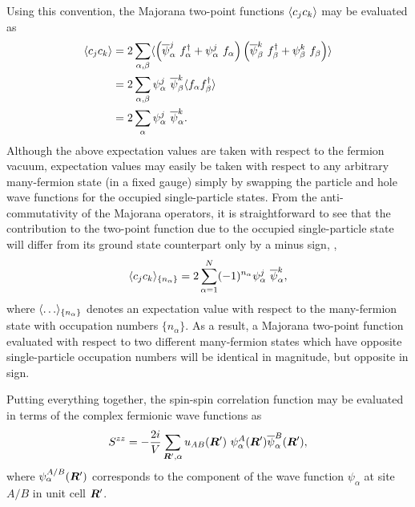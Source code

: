 Using this convention, the Majorana two-point functions $\langle c_j c_k \rangle$ may be evaluated as
%
\begin{align}
	\langle c_j c_k \rangle	&= 2 \sum_{\alpha, \beta} \langle  \left( \overline{\psi}^j_\alpha ~f^{\dagger}_\alpha + \psi^j_\alpha ~f_\alpha \right) \left( \overline{\psi}^k_\beta ~f^{\dagger}_\beta + \psi^k_\beta ~f_\beta \right)  \rangle \nonumber\\
					&= 2 \sum_{\alpha, \beta} \psi^j_\alpha ~\overline{\psi}^k_\beta \langle  f_\alpha f^{\dagger}_\beta  \rangle \nonumber\\
					&= 2 \sum_\alpha \psi^j_\alpha ~\overline{\psi}^k_\alpha.
	\label{eq:chapter07_TwoPointFermionZeroT}
\end{align}
%
Although the above expectation values are taken with respect to the fermion vacuum, expectation values may easily be taken with respect to any arbitrary many-fermion state (in a fixed gauge) simply by swapping the particle and hole wave functions for the occupied single-particle states.
From the anti-commutativity of the Majorana operators, it is straightforward to see that the contribution to the two-point function due to the occupied single-particle state will differ from its ground state counterpart only by a minus sign, \ie,
%
\begin{equation}
	\langle c_j c_k \rangle_{\{n_\alpha\}} = 2 \sum_{\alpha=1}^N (-1)^{n_\alpha} \psi^j_\alpha ~\overline{\psi}^k_\alpha,
\end{equation}
%
where $\langle \ldots \rangle_{\{n_\alpha\}}$ denotes an expectation value with respect to the many-fermion state with occupation numbers $\{n_\alpha\}$.
As a result, a Majorana two-point function evaluated with respect to two different many-fermion states which have opposite single-particle occupation numbers will be identical in magnitude, but opposite in sign.

Putting everything together, the spin-spin correlation function may be evaluated in terms of the complex fermionic wave functions as
%
\begin{equation}
	S^{z z}	= -\frac{2i}{V} \sum_{\bm{R}', \alpha} u_{AB}(\bm{R}')~\psi_{\alpha}^A(\bm{R}') \overline{\psi}_{\alpha}^B(\bm{R}'),
	\label{eq:chapter07_TwoSpinZeroT}
\end{equation}
%
where $\psi_{\alpha}^{A/B}(\bm{R}')$ corresponds to the component of the wave function $\psi_{\alpha}$ at site $A/B$ in unit cell $\bm{R}'$.


%
%
